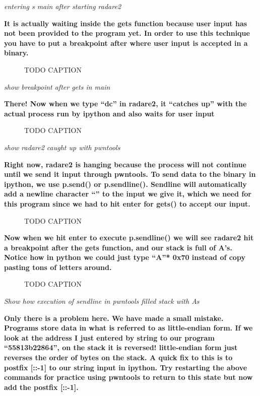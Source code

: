 \documentclass[letterpaper]{article}
\newcommand{\sitfig}[3]{
\begin{figure}[H]
\centering
\makebox[\textwidth][c]{
#2
}
\caption{#3}
\label{#1}
\end{figure}
}
\newcommand{\sitgfx}[4][scale=1.0]{
\sitfig{#3}{\texttt{[image: \#2]}}{#4}
}
\begin{document}
\textit{entering s main after starting radare2}

\textbf{It is actually waiting inside the gets function because user input has not been provided to the program yet. In
order to use this technique you have to put a breakpoint after where user input is accepted in a binary.}

  
\sitgfx[width=5.8335in,height=3.6457in]{FINALWORKINGDOCFORMERLYPRECURSOR-img101.png}{fig:unk}{TODO CAPTION}
 

\textit{show breakpoint after gets in main}

\textbf{There! Now when we type ``dc'' in radare2, it ``catches up'' with the actual process run by ipython and also
waits for user input}

  
\sitgfx[width=5.8335in,height=3.6457in]{FINALWORKINGDOCFORMERLYPRECURSOR-img102.png}{fig:unk}{TODO CAPTION}
 

\textit{show radare2 caught up with pwntools}

\textbf{Right now, radare2 is hanging because the process will not continue until we send it input through pwntools. To
send data to the binary in ipython, we use p.send() or p.sendline(). Sendline will automatically add a newline
character ``'' to the input we give it, which we need for this program since we had to hit enter for gets() to accept
our input.}\newline
  
\sitgfx[width=5.8335in,height=3.6457in]{FINALWORKINGDOCFORMERLYPRECURSOR-img103.png}{fig:unk}{TODO CAPTION}
 

\textbf{Now when we hit enter to execute p.sendline() we will see radare2 hit a breakpoint after the gets function, and
our stack is full of A's. Notice how in python we could just type ``A''* 0x70 instead of copy pasting tons of letters
around.}

  
\sitgfx[width=5.8335in,height=3.6457in]{FINALWORKINGDOCFORMERLYPRECURSOR-img104.png}{fig:unk}{TODO CAPTION}
 

\textit{Show how execution of sendline in pwntools filled stack with As}

\textbf{Only there is a problem here. We have made a small mistake. Programs store data in what is referred to as
little-endian form. If we look at the address I just entered by string to our program ``55813b22864'', on the stack it
is reversed! little-endian form just reverses the order of bytes on the stack. A quick fix to this is to postfix [::-1]
to our string input in ipython. Try restarting the above commands for practice using pwntools to return to this state
but now add the postfix [::-1].}
\end{document}
